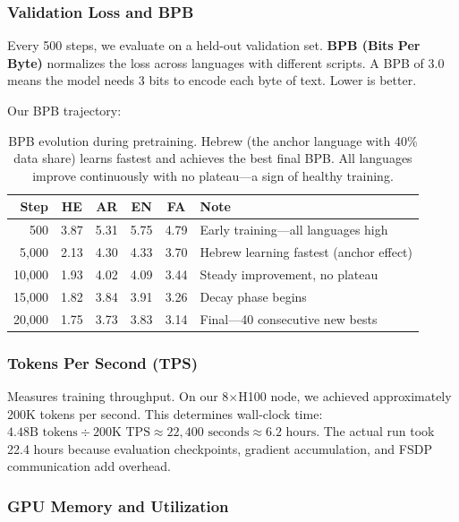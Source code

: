 \documentclass[11pt,a4paper]{article}
\begin{document}
\subsubsection{Validation Loss and BPB}

Every 500 steps, we evaluate on a held-out validation set. \textbf{BPB (Bits Per Byte)} normalizes the loss across languages with different scripts. A BPB of 3.0 means the model needs 3 bits to encode each byte of text. Lower is better.

Our BPB trajectory:

\begin{table}[H]
\centering\small
\begin{tabular}{rccccl}
\toprule
\textbf{Step} & \textbf{HE} & \textbf{AR} & \textbf{EN} & \textbf{FA} & \textbf{Note} \\
\midrule
500 & 3.87 & 5.31 & 5.75 & 4.79 & Early training---all languages high \\
5,000 & 2.13 & 4.30 & 4.33 & 3.70 & Hebrew learning fastest (anchor effect) \\
10,000 & 1.93 & 4.02 & 4.09 & 3.44 & Steady improvement, no plateau \\
15,000 & 1.82 & 3.84 & 3.91 & 3.26 & Decay phase begins \\
20,000 & 1.75 & 3.73 & 3.83 & 3.14 & Final---40 consecutive new bests \\
\bottomrule
\end{tabular}
\caption{BPB evolution during pretraining. Hebrew (the anchor language with 40\% data share) learns fastest and achieves the best final BPB. All languages improve continuously with no plateau---a sign of healthy training.}
\label{tab:bpb_evolution}
\end{table}

\subsubsection{Tokens Per Second (TPS)}

Measures training throughput. On our 8$\times$H100 node, we achieved approximately 200K tokens per second. This determines wall-clock time: $4.48\text{B tokens} \div 200\text{K TPS} \approx 22{,}400\text{ seconds} \approx 6.2\text{ hours}$. The actual run took 22.4 hours because evaluation checkpoints, gradient accumulation, and FSDP communication add overhead.

\subsubsection{GPU Memory and Utilization}
\end{document}
